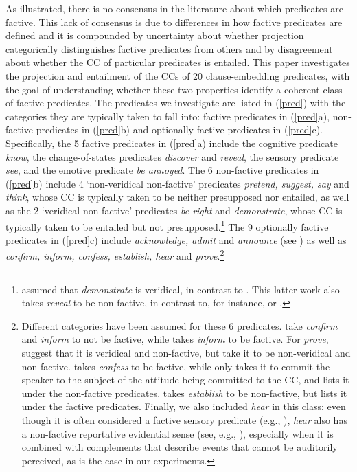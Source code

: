 \documentclass[11pt,fleqn]{article}
\newcommand{\6}{\mbox{$[\hspace*{-.6mm}[$}}
\newcommand{\9}{\mbox{$]\hspace*{-.6mm}]$}}
\begin{document}
As illustrated, there is no consensus in the literature about which predicates are factive. This lack of consensus is due to differences in how factive predicates are defined and it is compounded by uncertainty about whether projection categorically distinguishes factive predicates from others and by disagreement about whether the CC of particular predicates is entailed. This paper investigates the projection and entailment of the CCs of 20 clause-embedding predicates, with the goal of understanding whether these two properties identify a coherent class of factive predicates. The predicates we investigate are listed in (\ref{pred}) with the categories they are typically taken to fall into: factive predicates in (\ref{pred}a), non-factive predicates in (\ref{pred}b) and optionally factive predicates in (\ref{pred}c). Specifically, the 5 factive predicates in (\ref{pred}a) include the cognitive predicate {\em know}, the change-of-states predicates {\em discover} and {\em reveal}, the sensory predicate {\em see}, and the emotive predicate {\em be annoyed}. The 6 non-factive predicates in (\ref{pred}b) include 4 `non-veridical non-factive' predicates {\em pretend, suggest, say} and {\em think}, whose CC is typically taken to be neither presupposed nor entailed, as well as  the 2 `veridical non-factive' predicates {\em be right} and {\em demonstrate}, whose CC is typically taken to be entailed but not presupposed.\footnote{\citet{anand-hacquard2014} assumed that {\em demonstrate} is veridical, in contrast to \citealt{anand-etal2019}. This latter work also takes {\em reveal} to be non-factive, in contrast to, for instance, \citealt{egre2008,wyse} or \citealt{tbd-variability}.}  The 9 optionally factive predicates in (\ref{pred}c) include {\em acknowledge, admit} and {\em announce} (see \citealt{kiparsky-kiparsky70}) as well as {\em confirm, inform, confess, establish, hear} and {\em prove}.\footnote{Different categories have been assumed for these 6 predicates. \citet{anand-hacquard2014} take {\em confirm} and {\em inform}  to not be factive, while \citet{schlenker10} takes {\em inform} to be factive. For {\em prove}, \citet{white-rawlins-nels2018} suggest that it is veridical and non-factive, but \citet{anand-hacquard2014} take it to be non-veridical and non-factive. \citet{swanson2012}  takes {\em confess} to be factive, while \citet{karttunen2016} only takes it to commit the speaker to the subject of the attitude being committed to the CC, and \citet{wyse} lists it under the non-factive predicates. \citet{swanson2012} takes  {\em establish} to be non-factive, but \citet{wyse} lists it under the factive predicates. Finally, we also included {\em hear} in this class: even though it is often considered a factive sensory predicate (e.g., \citealt{beaver-belly,anand-hacquard2014}), {\em hear} also has a non-factive reportative evidential sense (see, e.g., \citealt{anderson86,simons07}), especially when it is combined with complements that describe events that cannot be auditorily perceived, as is the case in our experiments.}
\end{document}
